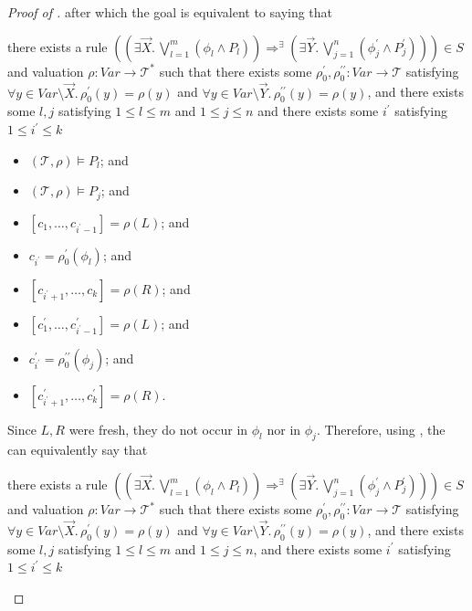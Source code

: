 \documentclass{article}
\newenvironment{proofenv}
  {
    \VerbatimEnvironment\begin{tcolorbox}[colback=black!0!white] %
  }
  {
   \end{tcolorbox}
  }
\begin{document}
\begin{proof}[Proof of ]
after which the goal is equivalent to saying that
\begin{proofenv}
there exists a rule $((\exists \vec{X}.\, \bigvee_{l=1}^{m} (\phi_l \land P_l)) \Rightarrow^\exists (\exists \vec{Y}.\, \bigvee_{j=1}^{n} (\phi^\prime_j \land P^\prime_j))) \in S$
and valuation $\rho : \mathit{Var} \to \mathcal{T}^*$ such that
there exists some $\rho_0^\prime,\rho_0^{\prime\prime} : \mathit{Var} \to \mathcal{T}$
satisfying $\forall y \in \mathit{Var} \setminus \vec{X}.\, \rho_0^\prime(y) = \rho(y)$
and $\forall y \in \mathit{Var} \setminus \vec{Y}.\, \rho_0^{\prime\prime}(y) = \rho(y)$,
and there exists some $l,j$ satisfying $1 \leq l \leq m$ and $1 \leq j \leq n$
and there exists some $i^\prime$ satisfying $1 \leq i^\prime \leq k$
\begin{itemize}
    \item $(\mathcal{T}, \rho) \vDash P_l$; and
    \item $(\mathcal{T}, \rho) \vDash P_j$; and
    \item $[c_1,\ldots, c_{i^\prime-1}] = \rho(L)$; and
    \item $c_{i^\prime} = \rho_0^\prime(\phi_l)$; and
    \item $[c_{i^\prime+1},\ldots,c_k] = \rho(R)$; and
    \item $[c^\prime_1,\ldots, c^\prime_{i^\prime-1}] = \rho(L)$; and
    \item $c^\prime_{i^\prime} = \rho_0^{\prime\prime}(\phi_j)$; and
    \item $[c^\prime_{i^\prime+1},\ldots,c^\prime_k] = \rho(R)$.
\end{itemize}
\end{proofenv}
Since $L,R$ were fresh, they do not occur in $\phi_l$ nor in $\phi_j$.
Therefore, using , the can equivalently say that
\begin{proofenv}
there exists a rule $((\exists \vec{X}.\, \bigvee_{l=1}^{m} (\phi_l \land P_l)) \Rightarrow^\exists (\exists \vec{Y}.\, \bigvee_{j=1}^{n} (\phi^\prime_j \land P^\prime_j))) \in S$
and valuation $\rho : \mathit{Var} \to \mathcal{T}^*$ such that
there exists some $\rho_0^\prime,\rho_0^{\prime\prime} : \mathit{Var} \to \mathcal{T}$
satisfying $\forall y \in \mathit{Var} \setminus \vec{X}.\, \rho_0^\prime(y) = \rho(y)$
and $\forall y \in \mathit{Var} \setminus \vec{Y}.\, \rho_0^{\prime\prime}(y) = \rho(y)$,
and there exists some $l,j$ satisfying $1 \leq l \leq m$ and $1 \leq j \leq n$,
and there exists some $i^\prime$ satisfying $1 \leq i^\prime \leq k$
\begin{itemize}

\end{itemize}
\end{proofenv}
\end{proof}
\end{document}
